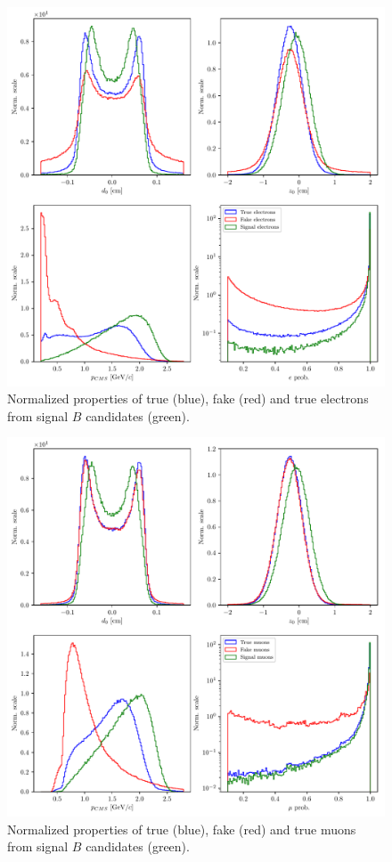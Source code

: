 \begin{figure}[!htb]
	\centering
	\includegraphics[width=\linewidth]{fig/FSP_e_vars}
	\captionsetup{width=.8\linewidth}
	\caption{Normalized properties of true (blue), fake (red) and true electrons from signal $B$ candidates (green).}
	\label{fig:evars}
\end{figure}

\begin{figure}[!htb]
	\centering
	\includegraphics[width=\linewidth]{fig/FSP_mu_vars}
	\captionsetup{width=.8\linewidth}
	\caption{Normalized properties of true (blue), fake (red) and true muons from signal $B$ candidates (green).}
	\label{fig:muvars}
\end{figure}

